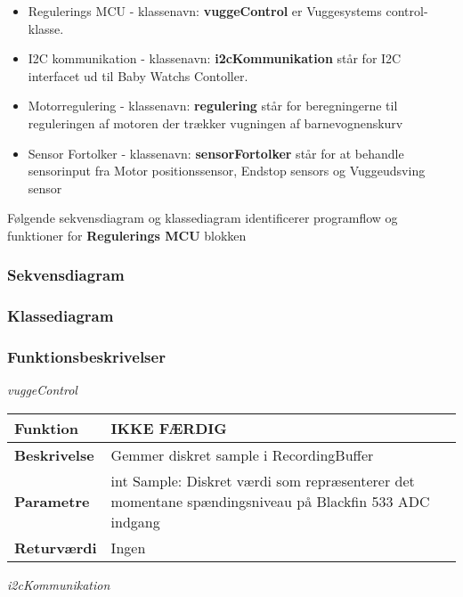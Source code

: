 \begin{itemize}
\item Regulerings MCU - klassenavn: \textbf{vuggeControl} er Vuggesystems control-klasse. 
\item I2C kommunikation - klassenavn: \textbf{i2cKommunikation} står for I2C interfacet ud til Baby Watchs Contoller.
\item Motorregulering - klassenavn: \textbf{regulering} står for beregningerne til reguleringen af motoren der trækker vugningen af barnevognenskurv
\item Sensor Fortolker - klassenavn: \textbf{sensorFortolker} står for at behandle sensorinput fra Motor positionssensor, Endstop sensors og Vuggeudsving sensor
\end{itemize}

Følgende sekvensdiagram og klassediagram  identificerer programflow og funktioner  for \textbf{Regulerings MCU} blokken

\subsubsection*{Sekvensdiagram}


\subsubsection*{Klassediagram}


\subsubsection*{Funktionsbeskrivelser}
\textit{vuggeControl} \\
\begin{center}
    \begin{tabular}{ | l | p{10cm} |}
    \hline
    \textbf{Funktion}	 	& IKKE FÆRDIG								\\ \hline
    \textbf{Beskrivelse} 	& Gemmer diskret sample i RecordingBuffer					\\ \hline
    \textbf{Parametre}		& int Sample: Diskret værdi som repræsenterer det momentane spændingsniveau på Blackfin 533 ADC indgang														 		\\ \hline
    \textbf{Returværdi} 	& Ingen		 												\\ \hline
    \end{tabular}
\end{center}
\textit{i2cKommunikation} \\

